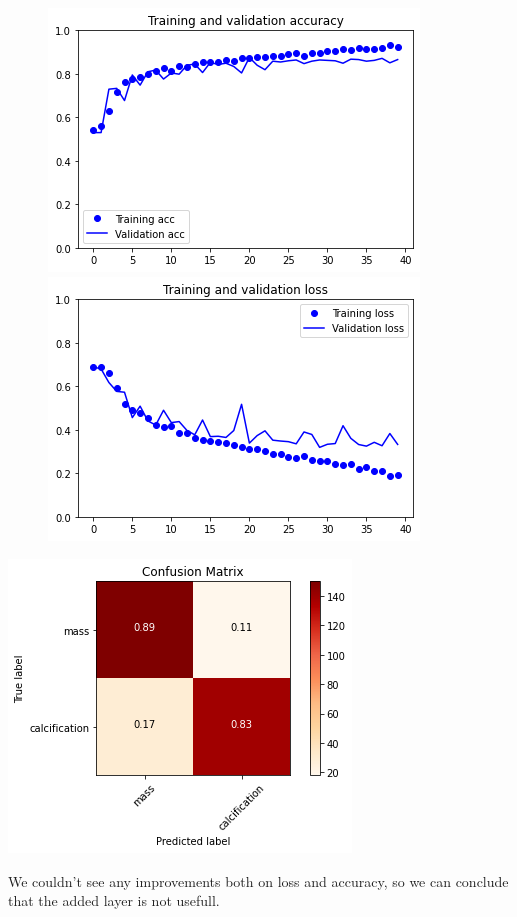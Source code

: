 \documentclass{article}
\begin{document}
\begin{figure}[h]
    \centering
    \begin{minipage}{0.45\textwidth}
        \centering
        \includegraphics[scale=0.46]{./img/scratchVal4.png}
    \end{minipage}\hfill
    \begin{minipage}{0.45\textwidth}
        \centering
        \includegraphics[scale=0.46]{./img/scratchLoss4.png}
    \end{minipage}
\end{figure}

\begin{center}
\begin{minipage}{0.45\textwidth}
        \includegraphics[scale=0.6]{./img/cmScratch4.png}
    \end{minipage}
\end{center}
We couldn't see any improvements both on loss and accuracy, so we can conclude that the added layer is not usefull.
\end{document}
